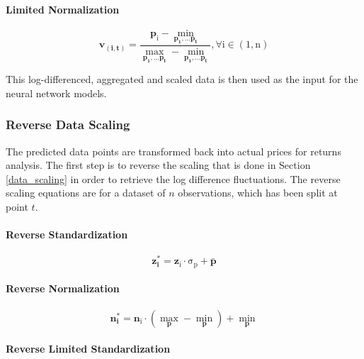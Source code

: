 \documentclass[a4paper,11pt,oneside]{article}
\theoremstyle{plain}
\theoremstyle{definition}
\begin{document}
	\paragraph{Limited Normalization}
	
	\begin{equation}\label{eq_ltd_normalize}
	\mathbf{v_{(i, t)}}  = 
	\mathrm{ \frac{\mathbf{p}_i - \min\limits_{\mathbf{p_1},\dots\mathbf{p_t}}} 
		{\max\limits_{\mathbf{p_1},\dots\mathbf{p_t}} - \min\limits_{\mathbf{p_1},\dots\mathbf{p_t}}} 
		, \forall  i \in (1, n)}
	\end{equation}
	
	
	This log-differenced, aggregated and scaled data is then used as the input for the neural network models.
	
	\subsubsection{Reverse Data Scaling}\label{data_reverse_scaling}
	
	The predicted data points are transformed back into actual prices for returns analysis. The first step is to reverse the scaling that is done in Section \ref{data_scaling} in order to retrieve the log difference fluctuations. The reverse scaling equations are for a dataset of $n$ observations, which has been split at point $t$.
	
	\paragraph{Reverse Standardization}
	
	\begin{equation}
	\mathbf{z^{*}_i} = \mathrm{{\mathbf{z}_i} \cdot \sigma_p + \mathbf{\bar{p}}}
	\end{equation}
	
	\paragraph{Reverse Normalization}
	
	\begin{equation}
	\mathbf{n^{*}_i} = \mathrm{\mathbf{n}_i \cdot \left(\max_{\mathbf{p}} - \min_{\mathbf{p}}\right) + \min_{\mathbf{p}}}
	\end{equation}
	
	\paragraph{Reverse Limited Standardization}
	
\end{document}
